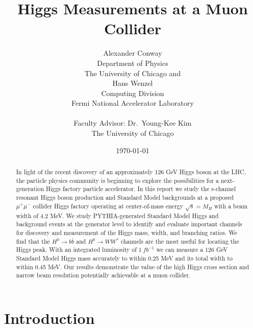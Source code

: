 \documentclass[a4paper]{article}
\title{Higgs Measurements at a Muon Collider}
\author{
	Alexander Conway \\
	Department of Physics\\
	The University of Chicago
	and\\
	Hans Wenzel\\
	Computing Division\\
	Fermi National Accelerator Laboratory\\
	\\
	Faculty Advisor: Dr.\ Young-Kee Kim\\
	The University of Chicago}
\date{\today}
\begin{document}
\maketitle

\begin{abstract}
	In light of the recent discovery of an approximately 126 GeV Higgs boson at the LHC, the particle physics community is beginning to explore the possibilities for a next-generation Higgs factory particle accelerator. In this report we study the s-channel resonant Higgs boson production and Standard Model backgrounds at a proposed $\mu^+\mu^-$ collider Higgs factory operating at center-of-mass energy $\sqrt{s} = M_H$ with a beam width of 4.2 MeV. We study PYTHIA-generated Standard Model Higgs and background events at the generator level to identify and evaluate important channels for discovery and measurement of the Higgs mass, width, and branching ratios. We find that the $H^0\rightarrow b\bar{b}$ and $H^0\rightarrow WW^*$ channels are the most useful for locating the Higgs peak. With an integrated luminosity of $1\ fb^{-1}$ we can measure a 126 GeV Standard Model Higgs mass accurately to within 0.25 MeV and its total width to within 0.45 MeV. Our results demonstrate the value of the high Higgs cross section and narrow beam resolution potentially achievable at a muon collider.
\end{abstract}

\tableofcontents

\section{Introduction}
\end{document}
